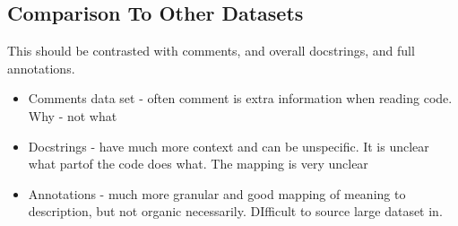 
\subsection{Comparison To Other Datasets} %
\label{sub:comparison_to_other_datasets}


    This should be contrasted with comments, and overall docstrings, and full annotations.
    \begin{itemize}
        \item Comments data set - often comment is extra information when reading code. Why - not what
        \item Docstrings - have much more context and can be unspecific. It is unclear what partof the code does what. The mapping is very unclear
        \item Annotations - much more granular and good mapping of meaning to description, but not organic necessarily. DIfficult to source large dataset in.
    \end{itemize}



